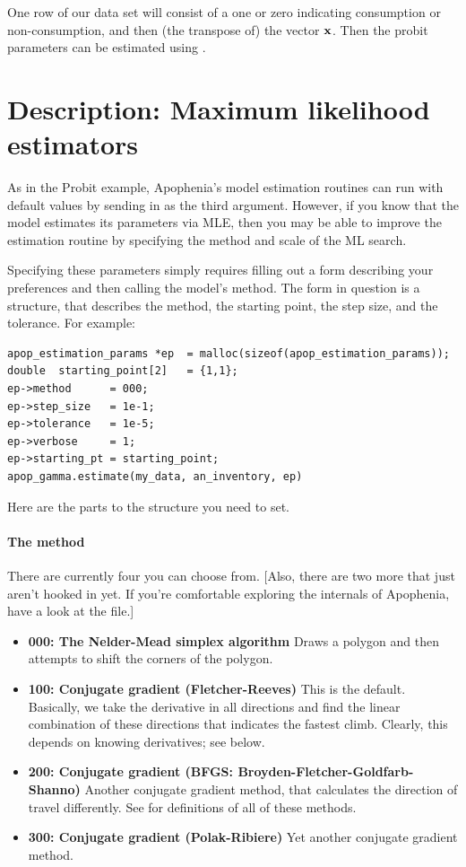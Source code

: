 One row of our data set will consist of a one or zero indicating
consumption or non-consumption, and then (the transpose of) the vector
${\bf x}$. Then the probit parameters can be estimated using
.

\section{Description: Maximum likelihood estimators} 
As in the Probit example, Apophenia's model estimation routines can run
with default values by sending in  as the third
argument. However, if you know that the model estimates its parameters
via MLE, then you may be able to improve the estimation routine by
specifying the method and scale of the ML search.

Specifying these parameters simply requires 
filling out a form describing your preferences and then calling the model's  method.
The form in question is a  structure, that
describes the method, the starting point, the step size, and the
tolerance.
For example:
\begin{lstlisting}
apop_estimation_params *ep  = malloc(sizeof(apop_estimation_params));
double  starting_point[2]   = {1,1};
ep->method      = 000;
ep->step_size   = 1e-1;
ep->tolerance   = 1e-5;
ep->verbose     = 1;
ep->starting_pt = starting_point;
apop_gamma.estimate(my_data, an_inventory, ep)
\end{lstlisting}

Here are the parts to the  
structure you need to set. 

\paragraph{The method} There are currently four you can choose from.
[Also, there are two more that  just aren't hooked in yet. If you're
comfortable exploring the internals of Apophenia, have a look at the
 file.]


\begin{itemize}
\item {\bf 000: The Nelder-Mead simplex algorithm} Draws a polygon and then attempts to shift the corners of the polygon.
\item {\bf 100: Conjugate gradient (Fletcher-Reeves)} This is the
default. Basically, we take the derivative in all directions and find
the linear combination of these directions that indicates the fastest
climb. Clearly, this depends on knowing derivatives; see below.
\item {\bf 200: Conjugate gradient (BFGS: Broyden-Fletcher-Goldfarb-Shanno)}  Another conjugate gradient method, that calculates the direction of travel differently. See \cite{avriel:nonlinear} for definitions of all of these methods.
\item {\bf 300: Conjugate gradient (Polak-Ribiere)} Yet another conjugate gradient method.
\end{itemize}

